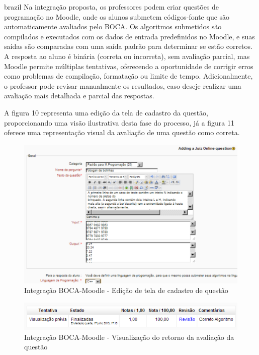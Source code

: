 \begin{otherlanguage*}{brazil}
Na integração proposta, os professores podem criar questões de programação no Moodle, onde os alunos submetem códigos-fonte que são automaticamente avaliados pelo BOCA. Os algoritmos submetidos são compilados e executados com os dados de entrada predefinidos no Moodle, e suas saídas são comparadas com uma saída padrão para determinar se estão corretos. A resposta ao aluno é binária (correta ou incorreta), sem avaliação parcial, mas Moodle permite múltiplas tentativas, oferecendo a oportunidade de corrigir erros como problemas de compilação, formatação ou limite de tempo. Adicionalmente, o professor pode revisar manualmente os resultados, caso deseje realizar uma avaliação mais detalhada e parcial das respostas.

A figura 10 representa uma edição da tela de cadastro da questão, proporcionando uma visão ilustrativa desta fase do processo, já a figura 11 oferece uma representação visual da avaliação de uma questão como correta.

\begin{figure}[h!]
	   \centering
            \caption{Integração BOCA-Moodle - Edição de tela de cadastro de questão}
            \label{fig:ModeloConceitual}
	   	\includegraphics[scale=0.4]{pictures/BOCA_edicao.png}
\end{figure}

\begin{figure}[h!]
	   \centering
            \caption{Integração BOCA-Moodle - Visualização do retorno da avaliação da questão}
            \label{fig:ModeloConceitual}
	   	\includegraphics[scale=0.4]{pictures/BOCA_visualizacao.png}
\end{figure}


\end{otherlanguage*}
